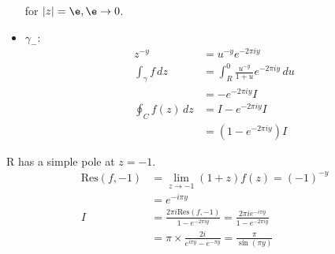 \documentclass[a4paper, 11pt, normalem]{report}
\begin{document}
\begin{example}
\begin{itemize}
\begin{equation}
            \end{equation}
            for $|z| = \e, \e \to 0$.
        \item $\gamma_{-}$:
            \begin{align}
                z^{-y} &= u^{-y} e^{-2\pi iy} \\
                \int_{\gamma} f\,dz &= \int_R^0 \frac{u^{-y}}{1+u}e^{-2\pi i y}\,du \\
                                    &= -e^{-2\pi i y}I \\
                \oint_C f(z)\,dz &= I - e^{-2\pi i y}I \\
                                 &= (1 - e^{-2\pi i y})I
            \end{align}
    \end{itemize}
    R has a simple pole at $z = -1$. 
    \begin{align}
        \text{Res}(f, -1) &= \lim_{z\to -1} (1+z)f(z) = (-1)^{-y} \\
                          &= e^{-i\pi y} \\
        I &= \frac{2\pi i\text{Res}(f,-1)}{1 - e^{-2\pi i y}} = \frac{2\pi ie^{-i\pi y}}{1 - e^{-2\pi i y}} \\
          &= \pi\times\frac{2i}{e^{i\pi y} - e^{-\pi y}} = \frac{\pi}{\sin(\pi y)}
    \end{align}
\end{example}

\newpage
\end{document}
